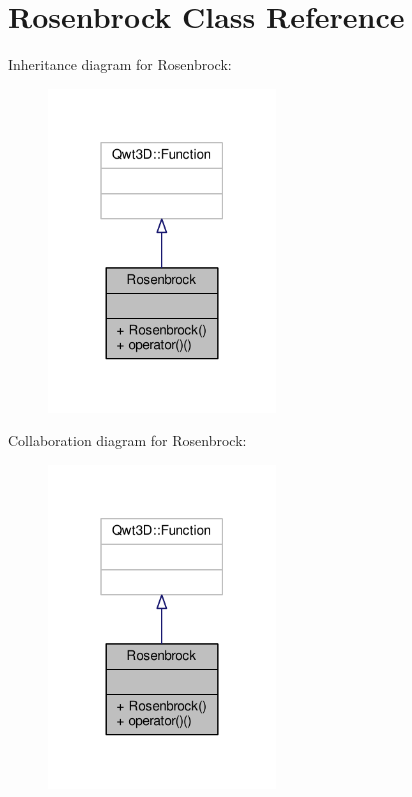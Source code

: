\hypertarget{classRosenbrock}{}\section{Rosenbrock Class Reference}
\label{classRosenbrock}


Inheritance diagram for Rosenbrock\+:
\nopagebreak
\begin{figure}[H]
\begin{center}
\leavevmode
\includegraphics[width=171pt]{classRosenbrock__inherit__graph}
\end{center}
\end{figure}


Collaboration diagram for Rosenbrock\+:
\nopagebreak
\begin{figure}[H]
\begin{center}
\leavevmode
\includegraphics[width=171pt]{classRosenbrock__coll__graph}
\end{center}
\end{figure}
